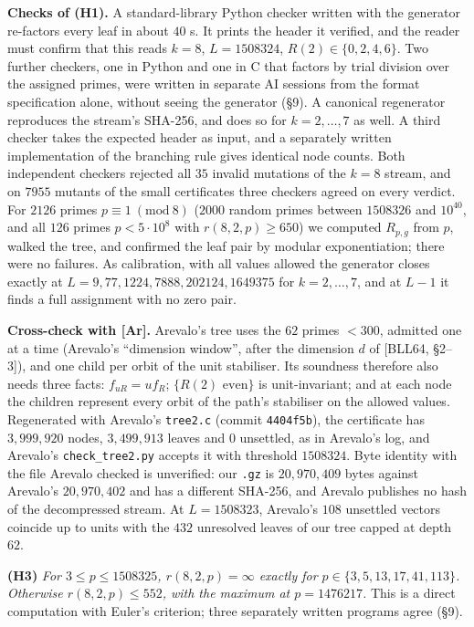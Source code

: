 \documentclass[
]{amsart}
\begin{document}
\textbf{Checks of (H1).} A standard-library Python checker written with
the generator re-factors every leaf in about \(40\) s. It prints the
header it verified, and the reader must confirm that this reads \(k=8\),
\(L=1508324\), \(R(2)\in\{0,2,4,6\}\). Two further checkers, one in
Python and one in C that factors by trial division over the assigned
primes, were written in separate AI sessions from the format
specification alone, without seeing the generator (§9). A canonical
regenerator reproduces the stream's SHA-256, and does so for
\(k=2,\dots,7\) as well. A third checker takes the expected header as
input, and a separately written implementation of the branching rule
gives identical node counts. Both independent checkers rejected all
\(35\) invalid mutations of the \(k=8\) stream, and on \(7955\) mutants
of the small certificates three checkers agreed on every verdict. For
\(2126\) primes \(p\equiv1\ (\mathrm{mod}\ 8)\) (\(2000\) random primes
between \(1508326\) and \(10^{40}\), and all \(126\) primes
\(p<5\cdot10^8\) with \(r(8,2,p)\ge650\)) we computed \(R_{p,g}\) from
\(p\), walked the tree, and confirmed the leaf pair by modular
exponentiation; there were no failures. As calibration, with all values
allowed the generator closes exactly at
\(L=9,77,1224,7888,202124,1649375\) for \(k=2,\dots,7\), and at \(L-1\)
it finds a full assignment with no zero pair.

\textbf{Cross-check with {[}Ar{]}.} Arevalo's tree uses the \(62\)
primes \(<300\), admitted one at a time (Arevalo's ``dimension window'',
after the dimension \(d\) of {[}BLL64, §2--3{]}), and one child per
orbit of the unit stabiliser. Its soundness therefore also needs three
facts: \(f_{uR}=uf_R\); \(\{R(2)\text{ even}\}\) is unit-invariant; and
at each node the children represent every orbit of the path's stabiliser
on the allowed values. Regenerated with Arevalo's \texttt{tree2.c}
(commit \texttt{4404f5b}), the certificate has \(3{,}999{,}920\) nodes,
\(3{,}499{,}913\) leaves and \(0\) unsettled, as in Arevalo's log, and
Arevalo's \texttt{check\_tree2.py} accepts it with threshold
\(1508324\). Byte identity with the file Arevalo checked is unverified:
our \texttt{.gz} is \(20{,}970{,}409\) bytes against Arevalo's
\(20{,}970{,}402\) and has a different SHA-256, and Arevalo publishes no
hash of the decompressed stream. At \(L=1508323\), Arevalo's \(108\)
unsettled vectors coincide up to units with the \(432\) unresolved
leaves of our tree capped at depth \(62\).

\textbf{(H3)} \emph{For \(3\le p\le1508325\), \(r(8,2,p)=\infty\)
exactly for \(p\in\{3,5,13,17,41,113\}\). Otherwise \(r(8,2,p)\le552\),
with the maximum at \(p=1476217\).} This is a direct computation with
Euler's criterion; three separately written programs agree (§9).
\end{document}

